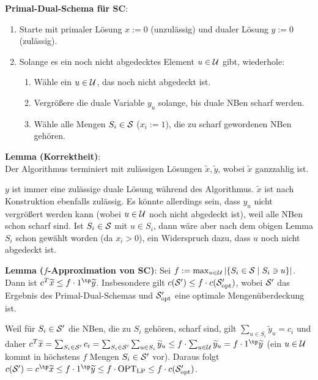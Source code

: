 \linie

\textbf{Primal-Dual-Schema für SC}:
\begin{enumerate}
    \item
    Starte mit primaler Lösung $x := 0$ (unzulässig) und
    dualer Lösung $y := 0$ (zulässig).
    
    \item
    Solange es ein noch nicht abgedecktes Element $u \in \U$ gibt, wiederhole:
    \begin{enumerate}
        \item
        Wähle ein $u \in \U$, das noch nicht abgedeckt ist.
        
        \item
        Vergrößere die duale Variable $y_u$ solange, bis duale NBen scharf werden.
        
        \item
        Wähle alle Mengen $S_i \in \S$ ($x_i := 1$), die zu scharf gewordenen NBen gehören.
    \end{enumerate}
\end{enumerate}

\textbf{Lemma (Korrektheit)}:\\
Der Algorithmus terminiert mit zulässigen Lösungen $\widetilde{x}, \widetilde{y}$,
wobei $\widetilde{x}$ ganzzahlig ist.

\begin{Beweis}
    $y$ ist immer eine zulässige duale Lösung während des Algorithmus.
    $\widetilde{x}$ ist nach Konstruktion ebenfalls zulässig.
    Es könnte allerdings sein, dass $y_u$ nicht vergrößert werden kann
    (wobei $u \in \U$ noch nicht abgedeckt ist), weil alle NBen schon scharf sind.
    Ist $S_i \in \S$ mit $u \in S_i$, dann wäre aber nach dem obigen Lemma
    $S_i$ schon gewählt worden (da $x_i > 0$), ein Widerspruch dazu,
    dass $u$ noch nicht abgedeckt ist.
\end{Beweis}

\linie

\textbf{Lemma ($f$-Approximation von SC)}:
Sei $f := \max_{u \in \U} |\{S_i \in \S \;|\; S_i \ni u\}|$.\\
Dann ist $c^T \widetilde{x} \le f \cdot 1^\tp \widetilde{y}$.
Insbesondere gilt
$c(\S') \le f \cdot c(\S'_\opt)$, wobei $\S'$ das Ergebnis des Primal-Dual-Schemas und
$\S'_\opt$ eine optimale Mengenüberdeckung ist.

\begin{Beweis}
    Weil für $S_i \in \S'$ die NBen, die zu $S_i$ gehören, scharf sind,
    gilt $\sum_{u \in S_i} \widetilde{y}_u = c_i$ und daher
    $c^T \widetilde{x} = \sum_{S_i \in \S'} c_i =
    \sum_{S_i \in \S'} \sum_{u \in S_i} \widetilde{y}_u
    \le f \cdot \sum_{u \in \U} \widetilde{y}_u = f \cdot 1^\tp \widetilde{y}$
    (ein $u \in \U$ kommt in höchstens $f$ Mengen $S_i \in \S'$ vor).
    Daraus folgt
    $c(\S') = c^\tp \widetilde{x} \le f \cdot 1^\tp \widetilde{y} \le f \cdot \OPTLP \le
    f \cdot c(\S'_\opt)$.
\end{Beweis}

